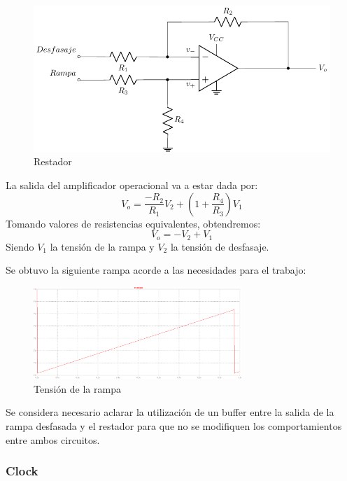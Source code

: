 \begin{figure}[H]
\centering
\includegraphics[scale=0.8]{Ejercicio8/Circuitos/Restador.pdf}
\caption{Restador}
\label{fig:Restador}
\end{figure}
La salida del amplificador operacional va a estar dada por:
\begin{equation}
V_o=\frac{-R_2}{R_1}V_2+\left(1+\frac{R_4}{R_3}\right)V_1
\end{equation}
Tomando valores de resistencias equivalentes, obtendremos:
\begin{equation}
V_o=-V_2+V_1
\end{equation}
Siendo $V_1$ la tensión de la rampa y $V_2$ la tensión de desfasaje.\par\par
Se obtuvo la siguiente rampa acorde a las necesidades para el trabajo:

\begin{figure}[H]
\centering
\includegraphics[width=0.7\textwidth]{Ejercicio8/Imagenes/Rampa}
\caption{Tensión de la rampa}
\label{fig:Generador_de_rampa_LTSpice}
\end{figure}



Se considera necesario aclarar la utilización de un buffer entre la salida de la rampa desfasada y el restador para que no se modifiquen los comportamientos entre ambos circuitos.\par

\subsubsection{Clock}


